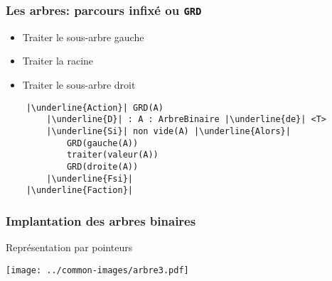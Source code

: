 \documentclass[table,handout,tikz,12pt,svgnames]{beamer}
\begin{document}
\begin{frame}[fragile=singleslide]
	\frametitle{Les arbres: parcours infixé ou \texttt{GRD}}
	\begin{block}{}%
		\begin{itemize}
			\item Traiter le sous-arbre gauche
			\item Traiter la racine
			\item Traiter le sous-arbre droit
		\end{itemize}
	\end{block}
	\begin{block}{}
		\begin{verbatim}
	|\underline{Action}| GRD(A)
		|\underline{D}| : A : ArbreBinaire |\underline{de}| <T>
		|\underline{Si}| non vide(A) |\underline{Alors}|
			GRD(gauche(A))
			traiter(valeur(A))
			GRD(droite(A))
		|\underline{Fsi}|
	|\underline{Faction}|		
		\end{verbatim}
	\end{block}
\end{frame}

\begin{frame}[fragile=singleslide]
	\frametitle{Implantation des arbres binaires}
	\begin{block}{Représentation par pointeurs}%
		\begin{center}
			{\texttt{[image: ../common-images/arbre3.pdf]}}
		\end{center}
	\end{block}
\end{frame}
\end{document}
